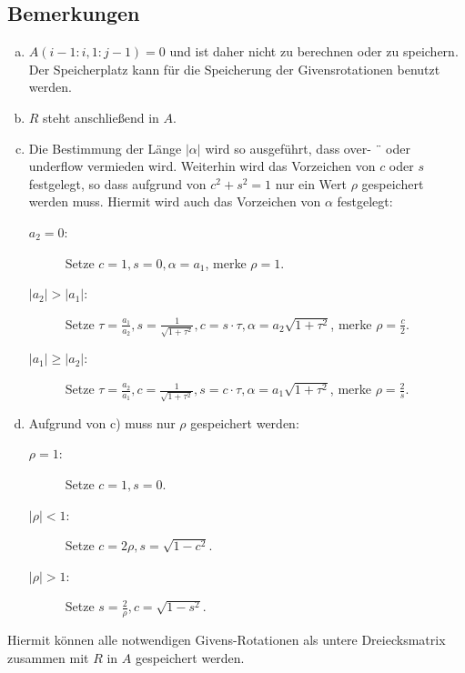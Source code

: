 \documentclass[ngerman,fontsize=11pt, paper=a4, parskip=half, titlepage=true, toc=bib]{scrbook}
\begin{document}
  \subsection{Bemerkungen} 
  \begin{enumerate}[a)]
  \item $A(i-1 : i, 1 : j-1) = 0$ und ist daher nicht zu berechnen oder
    zu speichern. Der Speicherplatz kann für die Speicherung der
    Givensrotationen benutzt werden.
  \item  $R$ steht anschließend in $A$.
  \item Die Bestimmung der Länge $|\alpha|$ wird so ausgeführt, dass over- ¨
    oder underflow vermieden wird. Weiterhin wird das Vorzeichen
    von $c$ oder $s$ festgelegt, so dass aufgrund von $c^2+s^2=1$ nur
    ein Wert $\rho$ gespeichert werden muss. Hiermit wird auch das
    Vorzeichen von $\alpha$ festgelegt:\\
    \begin{description}
    \item[$a_2=0$:] Setze $c=1, s=0, \alpha = a_1$, merke $\rho=1$.
    \item[$|a_2|>|a_1|$:] Setze $\tau= \frac{a_1}{a_2}, s=\frac{1}{\sqrt{1+\tau^2}}, c=s\cdot\tau, \alpha =a_2\sqrt{1+\tau^2}$, merke $\rho=\frac{c}{2}$.
    \item[$|a_1|\geq|a_2|$:] Setze $\tau= \frac{a_2}{a_1}, c=\frac{1}{\sqrt{1+\tau^2}}, s=c\cdot\tau, \alpha =a_1\sqrt{1+\tau^2}$, merke $\rho=\frac{2}{s}$.
    \end{description}
  \item Aufgrund von c) muss nur $\rho$ gespeichert werden:
    \begin{description}
    \item[$\rho=1$:] Setze $c=1, s=0$.
    \item[$|\rho|<1$:] Setze $c=2\rho , s= \sqrt{1-c^2}$.
    \item[$|\rho|>1$:] Setze $s=\frac{2}{\rho}, c=\sqrt{1-s^2}$.
    \end{description}
  \end{enumerate}
  Hiermit können alle notwendigen Givens-Rotationen als untere
  Dreiecksmatrix zusammen mit $R$ in $A$ gespeichert werden.
  
  
  
\end{document}

